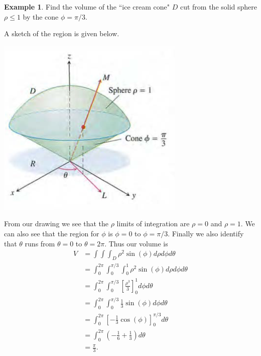 \documentclass[12pt, letter]{article}
\theoremstyle{plain}
\numberwithin{theorem}{section}
\theoremstyle{definition}
\newtheorem{example}[theorem]{Example}
\begin{document}
\begin{example}
Find the volume of the ``ice cream cone" $D$ cut from the solid sphere $\rho \leq 1$ by the cone $\phi = \pi/3$.

\bigskip

A sketch of the region is given below.

\bigskip

\begin{center}
\includegraphics[scale=0.7]{m3_f22}
\end{center}

\bigskip

From our drawing we see that the $\rho$ limits of integration are $\rho=0$ and $\rho=1$. We can also see that the region for $\phi$ is $\phi=0$ to $\phi=\pi/3$. Finally we also identify that $\theta$ runs from $\theta=0$ to $\theta=2\pi$. Thus our volume is
\begin{align*}
V &= \int\int\int_D \rho^2\sin(\phi)d\rho d\phi d\theta\\
&= \int_0^{2\pi} \int_0^{\pi/3} \int_0^1 \rho^2\sin(\phi)d\rho d\phi d\theta\\
&= \int_0^{2\pi} \int_0^{\pi/3} \left[\frac{\rho^3}{3}\right]_0^1 d\phi d\theta\\
&= \int_0^{2\pi} \int_0^{\pi/3} \frac{1}{3} \sin(\phi)d\phi d\theta\\
&= \int_0^{2\pi} \left[-\frac{1}{3}\cos(\phi)\right]_0^{\pi/3} d\theta\\
&= \int_0^{2\pi} \left(-\frac{1}{6} + \frac{1}{3} \right)d\theta\\
&= \frac{\pi}{3}.
\end{align*}

\end{example}
\end{document}
